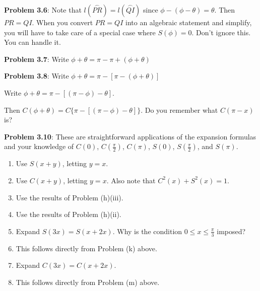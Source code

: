 \documentclass[english]{book}
\newcommand{\arc}[1]{\overset{\frown}{#1} }
\begin{document}
\vspace{0.3cm}

\textbf{Problem 3.6}: Note that $l(\arc{PR}) = l(\arc{QI})$ since $\phi - (\phi - \theta) = \theta$. Then $PR = QI$. When you convert $PR = QI$ into an algebraic statement and simplify, you will have to take care of a special case where $S(\phi) = 0$. Don't ignore this. You can handle it.

\vspace{0.3cm}

\textbf{Problem 3.7}: Write $\phi + \theta = \pi - \pi + (\phi+\theta)$

\vspace{0.3cm}

\textbf{Problem 3.8}: Write $\phi + \theta = \pi - [\pi - (\phi+\theta)]$

Write $\phi + \theta = \pi - [(\pi - \phi) - \theta]$.

Then $C(\phi + \theta) = C\{\pi-[(\pi-\phi)-\theta]\}$. Do you remember what $C(\pi-x)$ is?

\vspace{0.3cm}

\textbf{Problem 3.10}: These are straightforward applications of the expansion formulas and your knowledge of $C(0)$, $C(\frac{\pi}{2})$, $C(\pi)$, $S(0)$, $S(\frac{\pi}{2})$, and $S(\pi)$.
\begin{enumerate}
  \item[\hspace{1cm}g)] Use $S(x+y)$, letting $y=x$.
  \item[\hspace{1cm}h)] Use $C(x+y)$, letting $y=x$. Also note that $C^{2}(x)+S^{2}(x) = 1$.
  \item[\hspace{1cm}{i})] Use the results of Problem (h)(iii).
  \item[\hspace{1cm}j)] Use the results of Problem (h)(ii).
  \item[\hspace{1cm}k)] Expand $S(3x) = S(x+2x)$. Why is the condition $0 \leq x \leq \frac{\pi}{3}$ imposed?
  \item[\hspace{1cm}l)] This follows directly from Problem (k) above.
  \item[\hspace{1cm}m)] Expand $C(3x) = C(x+2x)$.
  \item[\hspace{1cm}n)] This follows directly from Problem (m) above.
\end{enumerate}
\end{document}
